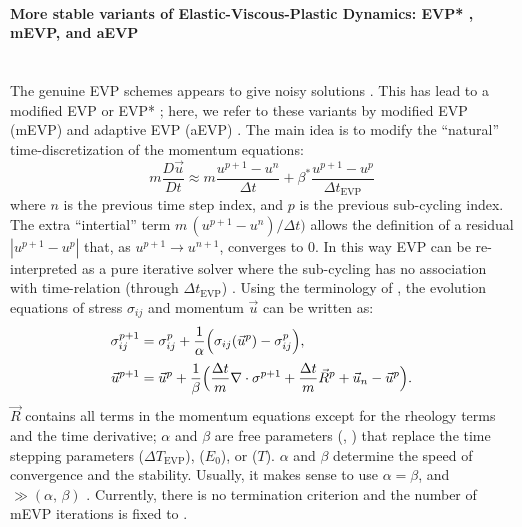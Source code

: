 \paragraph{More stable variants of Elastic-Viscous-Plastic Dynamics:
  EVP* , mEVP, and aEVP \label{sec:pkg:seaice:EVPstar}}~\\ 
%
The genuine EVP schemes appears to give noisy solutions \citep{hun01,
  lemieux12, bouillon13}. This has lead to a modified EVP or EVP*
\citep{lemieux12, bouillon13, kimmritz15}; here, we refer to these
variants by modified EVP (mEVP) and adaptive EVP (aEVP)
\citep{kimmritz16}. The main idea is to modify the ``natural'' 
time-discretization of the momentum equations:
\begin{equation}
  \label{eq:evpstar}
  m\frac{D\vec{u}}{Dt} \approx m\frac{u^{p+1}-u^{n}}{\Delta{t}}
  + \beta^{*}\frac{u^{p+1}-u^{p}}{\Delta{t}_{\mathrm{EVP}}}
\end{equation}
where $n$ is the previous time step index, and $p$ is the previous
sub-cycling index. The extra ``intertial'' term
$m\,(u^{p+1}-u^{n})/\Delta{t})$ allows the definition of a residual
$|u^{p+1}-u^{p}|$ that, as $u^{p+1} \rightarrow u^{n+1}$, converges to
$0$. In this way EVP can be re-interpreted as a pure iterative solver
where the sub-cycling has no association with time-relation (through
$\Delta{t}_{\mathrm{EVP}}$) \citep{bouillon13, kimmritz15}. Using the
terminology of \citet{kimmritz15}, the evolution equations of stress
$\sigma_{ij}$ and momentum $\vec{u}$ can be written as:
\begin{align}
  \label{eq:evpstarsigma}
  \sigma_{ij}^{p+1}&=\sigma_{ij}^p+\frac{1}{\alpha}
  \Big(\sigma_{ij}(\vec{u}^p)-\sigma_{ij}^p\Big),
  \phantom{\int}\\
  \label{eq:evpstarmom}
  \vec{u}^{p+1}&=\vec{u}^p+\frac{1}{\beta}
  \Big(\frac{\Delta t}{m}\nabla \cdot{\bf \sigma}^{p+1}+
  \frac{\Delta t}{m}\vec{R}^{p}+\vec{u}_n-\vec{u}^p\Big).
\end{align}
$\vec{R}$ contains all terms in the momentum equations except for the
rheology terms and the time derivative; $\alpha$ and $\beta$ are free
parameters (, ) that
replace the time stepping parameters 
($\Delta{T}_{\mathrm{EVP}}$),  ($E_{0}$), or
 ($T$). $\alpha$ and $\beta$ determine the
speed of convergence and the stability. Usually, it makes sense to use
$\alpha = \beta$, and  $\gg
(\alpha,\,\beta)$ \citep{kimmritz15}. Currently, there is no
termination criterion and the number of mEVP iterations is fixed to
.

